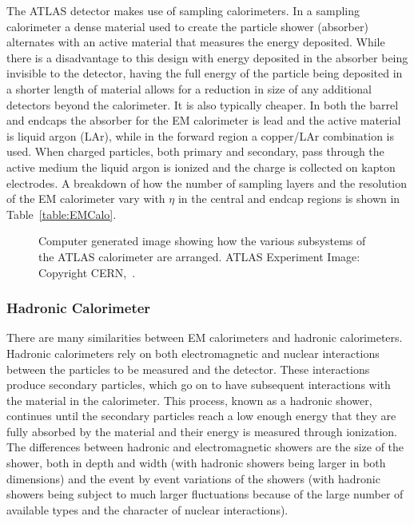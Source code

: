 
The ATLAS detector makes use of sampling calorimeters.  
In a sampling calorimeter a dense material used to create the particle shower (absorber) alternates with an active material that measures the energy deposited.  
While there is a disadvantage to this design with energy deposited in the absorber being invisible to the detector, having the full energy of the particle being deposited in a shorter length of material allows for a reduction in size of any additional detectors beyond the calorimeter.  
It is also typically cheaper.  
In both the barrel and endcaps the absorber for the EM calorimeter is lead and the active material is liquid argon (LAr), while in the forward region a copper/LAr combination is used.  
When charged particles, both primary and secondary, pass through the active medium the liquid argon is ionized and the charge is collected on kapton electrodes.  
A breakdown of how the number of sampling layers and the resolution of the EM calorimeter vary with $\eta$ in the central and endcap regions is shown in Table~\ref{table:EMCalo}.  

\begin{figure}[!ht]
  \begin{center}
  \end{center}
  \caption[Layout of the ATLAS Calorimeters]
  {\small Computer generated image showing how the various subsystems of the ATLAS calorimeter are arranged.  ATLAS Experiment Image: Copyright CERN,~\cite{Pequenao:1095927}.}
\end{figure}


\subsubsection{Hadronic Calorimeter}
\label{Had}
There are many similarities between EM calorimeters and hadronic calorimeters.  
Hadronic calorimeters rely on both electromagnetic and nuclear interactions between the particles to be measured and the detector.  
These interactions produce secondary particles, which go on to have subsequent interactions with the material in the calorimeter.  
This process, known as a hadronic shower, continues until the secondary particles reach a low enough energy that they are fully absorbed by the material and their energy is measured through ionization.  
The differences between hadronic and electromagnetic showers are the size of the shower, both in depth and width (with hadronic showers being larger in both dimensions) and the event by event variations of the showers (with hadronic showers being subject to much larger fluctuations because of the large number of available types and the character of nuclear interactions).  


